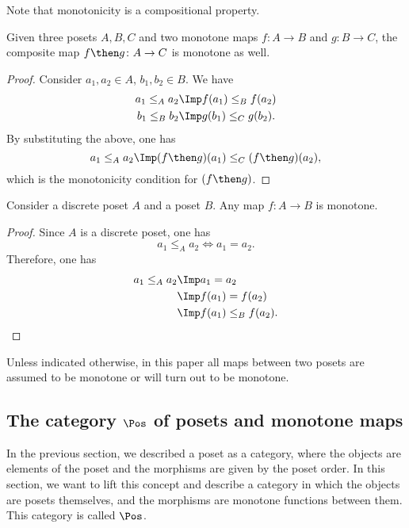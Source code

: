 \noindent Note that monotonicity is a compositional property.

\begin{lemma}Given three posets $A, B, C$ and two monotone maps $f\colon A
\to B$ and  $g\colon B \to C$, the composite map $f\then g\colon  A \to C$ is
monotone as well.
\end{lemma}
\begin{proof}
Consider $a_1,a_2 \in A$, $b_1,b_2\in B$. We have 
\begin{equation}
\begin{aligned}
        a_1\leq_A a_2 &\Imp f(a_1)\leq_B f(a_2)\\ 
        b_1\leq_B b_2 &\Imp g(b_1)\leq_C g(b_2).
\end{aligned}
\end{equation}
By substituting the above, one has
\begin{equation}
    a_1\leq_A a_2 \Imp (f\then g)(a_1) \leq_C (f\then g)(a_2),
\end{equation}
which is the monotonicity condition for $(f\then g)$.
\end{proof}

\begin{lemma}
Consider a discrete poset $A$ and a poset $B$. Any map $f\colon A\to B$ is monotone.
\end{lemma}
\begin{proof}
Since $A$ is a discrete poset, one has
\begin{equation}
    a_1\leq_A a_2 \iff a_1=a_2.
\end{equation}
Therefore, one has
\begin{equation}
\begin{aligned}
    a_1\leq_A a_2 &\Imp a_1=a_2\\
    &\Imp f(a_1)=f(a_2)\\
    &\Imp f(a_1)\leq_B f(a_2).
\end{aligned}
\end{equation}
\end{proof}
Unless indicated otherwise, in this paper all maps between two posets
are assumed to be monotone or will turn out to be monotone.

\subsection{The category $\Pos$ of posets and monotone maps}
In the previous section, we described a poset as a category, where the objects are elements of the poset and the morphisms are given by the poset order. In this section, we want to lift this concept and describe a category in which the objects are posets themselves, and the morphisms are monotone functions between them. This category is called $\Pos$.

